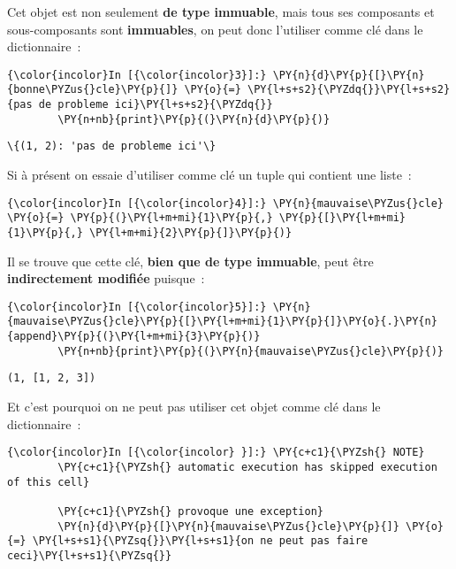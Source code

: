     Cet objet est non seulement \textbf{de type immuable}, mais tous ses
composants et sous-composants sont \textbf{immuables}, on peut donc
l'utiliser comme clé dans le dictionnaire~:

    \begin{Verbatim}[commandchars=\\\{\}]
{\color{incolor}In [{\color{incolor}3}]:} \PY{n}{d}\PY{p}{[}\PY{n}{bonne\PYZus{}cle}\PY{p}{]} \PY{o}{=} \PY{l+s+s2}{\PYZdq{}}\PY{l+s+s2}{pas de probleme ici}\PY{l+s+s2}{\PYZdq{}}
        \PY{n+nb}{print}\PY{p}{(}\PY{n}{d}\PY{p}{)}
\end{Verbatim}


    \begin{Verbatim}[commandchars=\\\{\}]
\{(1, 2): 'pas de probleme ici'\}

    \end{Verbatim}

    Si à présent on essaie d'utiliser comme clé un tuple qui contient une
liste~:

    \begin{Verbatim}[commandchars=\\\{\}]
{\color{incolor}In [{\color{incolor}4}]:} \PY{n}{mauvaise\PYZus{}cle} \PY{o}{=} \PY{p}{(}\PY{l+m+mi}{1}\PY{p}{,} \PY{p}{[}\PY{l+m+mi}{1}\PY{p}{,} \PY{l+m+mi}{2}\PY{p}{]}\PY{p}{)}
\end{Verbatim}


    Il se trouve que cette clé, \textbf{bien que de type immuable}, peut
être \textbf{indirectement modifiée} puisque~:

    \begin{Verbatim}[commandchars=\\\{\}]
{\color{incolor}In [{\color{incolor}5}]:} \PY{n}{mauvaise\PYZus{}cle}\PY{p}{[}\PY{l+m+mi}{1}\PY{p}{]}\PY{o}{.}\PY{n}{append}\PY{p}{(}\PY{l+m+mi}{3}\PY{p}{)}
        \PY{n+nb}{print}\PY{p}{(}\PY{n}{mauvaise\PYZus{}cle}\PY{p}{)}
\end{Verbatim}


    \begin{Verbatim}[commandchars=\\\{\}]
(1, [1, 2, 3])

    \end{Verbatim}

    Et c'est pourquoi on ne peut pas utiliser cet objet comme clé dans le
dictionnaire~:

    \begin{Verbatim}[commandchars=\\\{\}]
{\color{incolor}In [{\color{incolor} }]:} \PY{c+c1}{\PYZsh{} NOTE}
        \PY{c+c1}{\PYZsh{} automatic execution has skipped execution of this cell}
        
        \PY{c+c1}{\PYZsh{} provoque une exception}
        \PY{n}{d}\PY{p}{[}\PY{n}{mauvaise\PYZus{}cle}\PY{p}{]} \PY{o}{=} \PY{l+s+s1}{\PYZsq{}}\PY{l+s+s1}{on ne peut pas faire ceci}\PY{l+s+s1}{\PYZsq{}}
\end{Verbatim}


